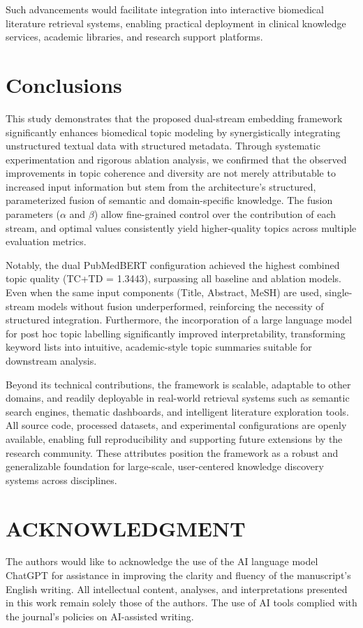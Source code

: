 \documentclass{ieeeaccess}
\begin{document}
Such advancements would facilitate integration into interactive biomedical literature retrieval systems, enabling practical deployment in clinical knowledge services, academic libraries, and research support platforms.

\section{Conclusions}

This study demonstrates that the proposed dual-stream embedding framework significantly enhances biomedical topic modeling by synergistically integrating unstructured textual data with structured metadata. Through systematic experimentation and rigorous ablation analysis, we confirmed that the observed improvements in topic coherence and diversity are not merely attributable to increased input information but stem from the architecture's structured, parameterized fusion of semantic and domain-specific knowledge. The fusion parameters ($\alpha$ and $\beta$) allow fine-grained control over the contribution of each stream, and optimal values consistently yield higher-quality topics across multiple evaluation metrics.

Notably, the dual PubMedBERT configuration achieved the highest combined topic quality (TC+TD = 1.3443), surpassing all baseline and ablation models. Even when the same input components (Title, Abstract, MeSH) are used, single-stream models without fusion underperformed, reinforcing the necessity of structured integration. Furthermore, the incorporation of a large language model for post hoc topic labelling significantly improved interpretability, transforming keyword lists into intuitive, academic-style topic summaries suitable for downstream analysis.

Beyond its technical contributions, the framework is scalable, adaptable to other domains, and readily deployable in real-world retrieval systems such as semantic search engines, thematic dashboards, and intelligent literature exploration tools. All source code, processed datasets, and experimental configurations are openly available, enabling full reproducibility and supporting future extensions by the research community. These attributes position the framework as a robust and generalizable foundation for large-scale, user-centered knowledge discovery systems across disciplines.

\section*{ACKNOWLEDGMENT}
The authors would like to acknowledge the use of the AI language model ChatGPT for assistance in improving the clarity and fluency of the manuscript's English writing. All intellectual content, analyses, and interpretations presented in this work remain solely those of the authors. The use of AI tools complied with the journal's policies on AI-assisted writing.
\end{document}
